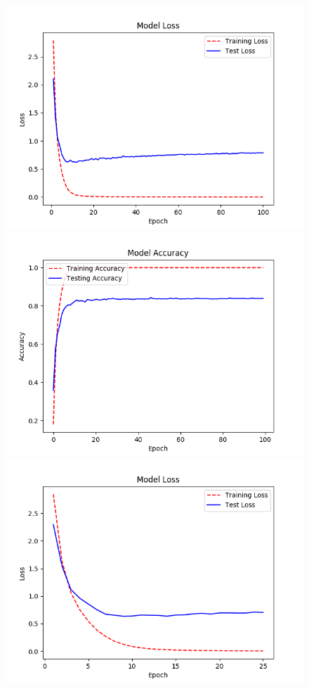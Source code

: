 \documentclass[11pt]{article}
\begin{document}
\begin{figure}[H]
\begin{center}
    \includegraphics[scale=0.5]{images/OldModelLoss100Epochs.png}
    \includegraphics[scale = 0.5]{images/OldModelAccuracy100Epochs.png}
    \includegraphics[scale=0.5]{images/OldModelLoss25Epochs.png}

\end{center}
\end{figure}
\end{document}
